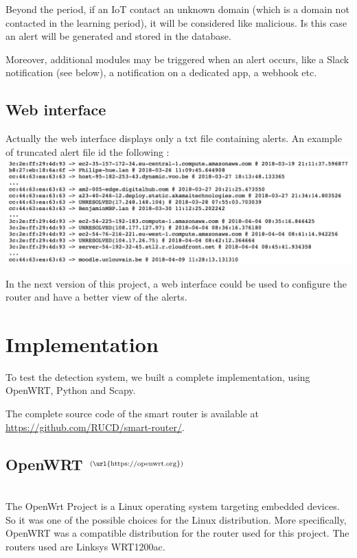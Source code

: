 \begin{frame}{}
\begin{multicols}{3}
Beyond the period, if an IoT contact an unknown domain (which is a domain not contacted in the learning period), it will be considered like malicious. Is this case an alert will be generated and stored in the database.



Moreover, additional modules may be triggered when an alert occurs, like a Slack notification (see below), a notification on a dedicated app, a webhook etc.

\subsection{Web interface}
Actually the web interface displays only a txt file containing alerts. An example of truncated alert file id the following : 
\includegraphics[width=\linewidth]{Pictures/alerts.png}

In the next version of this project, a web interface could be used to configure the router and have a better view of the alerts.



\section{Implementation}

To test the detection system, we built a complete implementation, using OpenWRT, Python and Scapy.

The complete source code of the smart router is available at \url{https://github.com/RUCD/smart-router/}.

\subsection{OpenWRT $^{(\text{\url{https://openwrt.org}})}$}\\
The OpenWrt Project is a Linux operating system targeting embedded devices. So it was one of the possible choices for the Linux distribution. More specifically, OpenWRT was a compatible distribution for the router used for this project. The routers used are Linksys WRT1200ac.


\end{multicols}
\end{frame}
